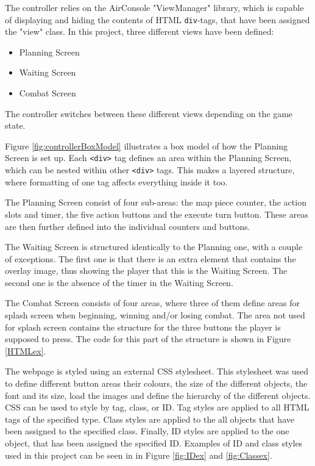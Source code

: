 The controller relies on the AirConsole "ViewManager" library, which is capable of displaying and hiding the contents of HTML \texttt{div}-tags, that have been assigned the "view" class. In this project, three different views have been defined:
\begin{itemize}
	\item Planning Screen
	\item Waiting Screen
	\item Combat Screen
\end{itemize}

The controller switches between these different views depending on the game state.

Figure \ref{fig:controllerBoxModel} illustrates a box model of how the Planning Screen is set up. Each \texttt{<div>} tag defines an area within the Planning Screen, which can be nested within other \texttt{<div>} tags. This makes a layered structure, where formatting of one tag affects everything inside it too.

The Planning Screen consist of four sub-areas: the map piece counter, the action slots and timer, the five action buttons and the execute turn button. These areas are then further defined into the individual counters and buttons.

The Waiting Screen is structured identically to the Planning one, with a couple of exceptions. The first one is that there is an extra element that contains the overlay image, thus showing the player that this is the Waiting Screen. The second one is the absence of the timer in the Waiting Screen.

The Combat Screen consists of four areas, where three of them define areas for splash screen when beginning, winning and/or losing combat. The area not used for splash screen contains the structure for the three buttons the player is supposed to press. The code for this part of the structure is shown in Figure \ref{HTMLex}.

The webpage is styled using an external CSS stylesheet. This stylesheet was used to define different button areas their colours, the size of the different objects, the font and its size, load the images and define the hierarchy of the different objects. CSS can be used to style by tag, class, or ID. Tag styles are applied to all HTML tags of the specified type. Class styles are applied to the all objects that have been assigned to the specified class. Finally, ID styles are applied to the one object, that has been assigned the specified ID. Examples of ID and class styles used in this project can be seen in in Figure \ref{fig:IDex} and \ref{fig:Classex}. 

